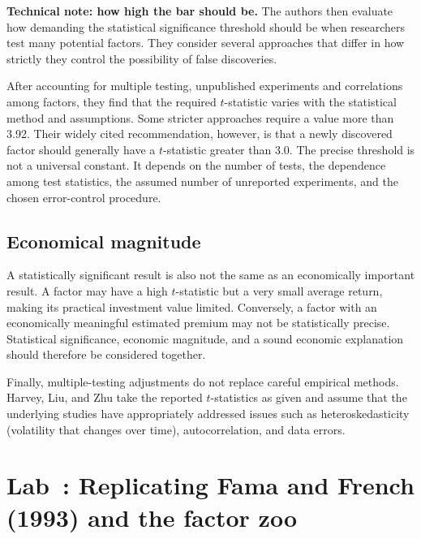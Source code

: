 \begin{technote}
\textbf{Technical note: how high the bar should be.} The authors then evaluate how demanding the statistical
significance threshold should be when researchers test many
potential factors. They consider several approaches that
differ in how strictly they control the possibility of false
discoveries. 


After accounting for multiple testing, unpublished
experiments and correlations among factors, they find
that the required $t$-statistic varies with the statistical
method and assumptions. Some stricter approaches require
a value more than 3.92. Their widely cited recommendation,
however, is that a newly discovered factor should generally
have a $t$-statistic greater than 3.0.
The precise threshold is not a universal constant. It depends
on the number of tests, the dependence among test statistics,
the assumed number of unreported experiments, and the chosen
error-control procedure.
\end{technote}

\subsection{Economical magnitude}
A statistically significant result is also not the same
as an economically important result. A factor may have a
high $t$-statistic but a very small average return, making
its practical investment value limited. Conversely, a
factor with an economically meaningful estimated premium
may not be statistically precise. Statistical significance,
economic magnitude, and a sound economic explanation
should therefore be considered together.

Finally, multiple-testing adjustments do not replace
careful empirical methods. Harvey, Liu, and Zhu take the
reported $t$-statistics as given and assume that the
underlying studies have appropriately addressed issues
such as heteroskedasticity (volatility that changes over time), autocorrelation, and data
errors.


\section{Lab~\thechapter: Replicating Fama and French (1993) and the factor zoo}
\label{sec:04-lab}

